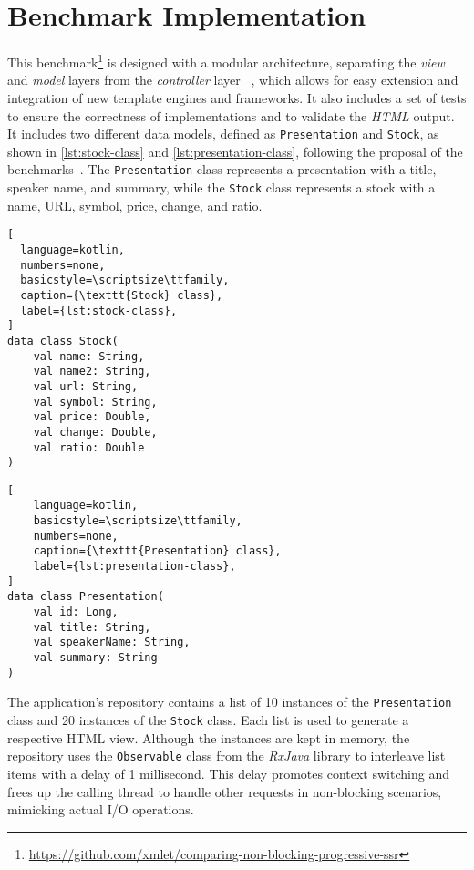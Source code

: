 \section{Benchmark Implementation}
\label{sec:bench}

This benchmark\footnote{\url{https://github.com/xmlet/comparing-non-blocking-progressive-ssr}}
is designed with a modular architecture, separating the \textit{view} and
\textit{model} layers from the \textit{controller} layer ~\cite{Bucanek2009},
which allows for easy extension and integration of new template engines and
frameworks. It also includes a set of tests to ensure the correctness of
implementations and to validate the \textit{HTML} output. It includes two
different data models, defined as \texttt{Presentation} and \texttt{Stock}, as
shown in \autoref{lst:stock-class} and \autoref{lst:presentation-class},
following the proposal of the
benchmarks~\cite{templatesbenchmark,springbenchmark}. The \texttt{Presentation}
class represents a presentation with a title, speaker name, and summary, while
the \texttt{Stock} class represents a stock with a name, URL, symbol, price,
change, and ratio.

\begin{center}
      \begin{minipage}{0.48\textwidth}
            \begin{lstlisting}[
  language=kotlin,
  numbers=none,
  basicstyle=\scriptsize\ttfamily,
  caption={\texttt{Stock} class},
  label={lst:stock-class},
]
data class Stock(
    val name: String,
    val name2: String,
    val url: String,
    val symbol: String,
    val price: Double, 
    val change: Double, 
    val ratio: Double
)
\end{lstlisting}
      \end{minipage}
      \hfill
      \begin{minipage}{0.48\textwidth}
            \begin{lstlisting}[
    language=kotlin,
    basicstyle=\scriptsize\ttfamily,
    numbers=none,
    caption={\texttt{Presentation} class},
    label={lst:presentation-class},
]
data class Presentation(
    val id: Long,
    val title: String, 
    val speakerName: String,
    val summary: String
)
\end{lstlisting}
      \end{minipage}
\end{center}

The application's repository contains a list of 10 instances of the
\texttt{Presentation} class and 20 instances of the \texttt{Stock} class. Each
list is used to generate a respective HTML view. Although the instances are
kept in memory, the repository uses the \texttt{Observable} class from the
\textit{RxJava} library to interleave list items with a delay of 1 millisecond.
This delay promotes context switching and frees up the calling thread to handle
other requests in non-blocking scenarios, mimicking actual I/O operations.

